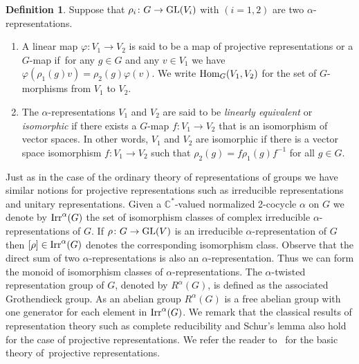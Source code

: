 \documentclass[10pt,a4paper]{amsart}
\def\C{\mathbb{C}}
\DeclareMathOperator{\Hom}{\textup{Hom}}
\DeclareMathOperator{\Irr}{\textup{Irr}}
\theoremstyle{definition}
\newtheorem{Def}[Th]{Definition}
\numberwithin{equation}{section}
\begin{document}
\begin{Def}
Suppose that $\rho_{i}\colon G\rightarrow {\rm GL}(V_{i})$ with $(i=1,2)$ are two $\alpha$-representations.
\begin{enumerate}\itemsep=0pt
\item A linear map $\varphi\colon V_{1}\to V_{2}$ is said to be a map of projective representations or a
$G$-map if~for any $g\in G$ and any $v\in V_{1}$ we have $\varphi(\rho_{1}(g)v)=\rho_{2}(g)\varphi(v)$.
We write $\Hom_{G}(V_{1},V_{2})$ for the set of $G$-morphisms from $V_{1}$ to $V_{2}$.

\item The $\alpha$-representations $V_{1}$ and $V_{2}$
are said to be \textit{linearly equivalent} or \textit{isomorphic} if
there exists a $G$-map $f\colon V_{1}\to V_{2}$ that is an isomorphism of vector spaces.
In other words, $V_{1}$ and $V_{2}$ are isomorphic if there is a vector space
isomorphism $f\colon V_{1}\rightarrow V_{2}$ such that $\rho_{2}(g)=f\rho_{1}(g)f^{-1}$ for all $g\in G$.
\end{enumerate}
\end{Def}

Just as in the case of the ordinary theory of representations of groups
we have similar notions for projective representations such as irreducible representations
and unitary representations. Given a $\C^{\ast}$-valued normalized 2-cocycle $\alpha$ on
$G$ we denote by $\Irr^{\alpha}(G)$ the set of isomorphism classes of
complex irreducible $\alpha$-representations of $G$.
If $\rho\colon G\to {\rm GL}(V)$ is an irreducible $\alpha$-representation of $G$ then $[\rho]\in \Irr^{\alpha}(G)$
denotes the corresponding isomorphism class. Observe that the direct sum of two $\alpha$-representations
is also an $\alpha$-representation. Thus we can form the monoid of isomorphism classes of $\alpha$-representations.
The $\alpha$-twisted representation group of $G$, denoted by $R^{\alpha}(G)$,
is defined as the associated Grothendieck group. As an abelian group $R^{\alpha}(G)$ is a free abelian
group with one generator for each element in $\Irr^{\alpha}(G)$.
We remark that the classical results of representation theory
such as complete reducibility and Schur's lemma also hold for the case of projective representations.
We refer the reader to~\cite{Karpilovsky2} for
the basic theory of~projective representations.
\end{document}
